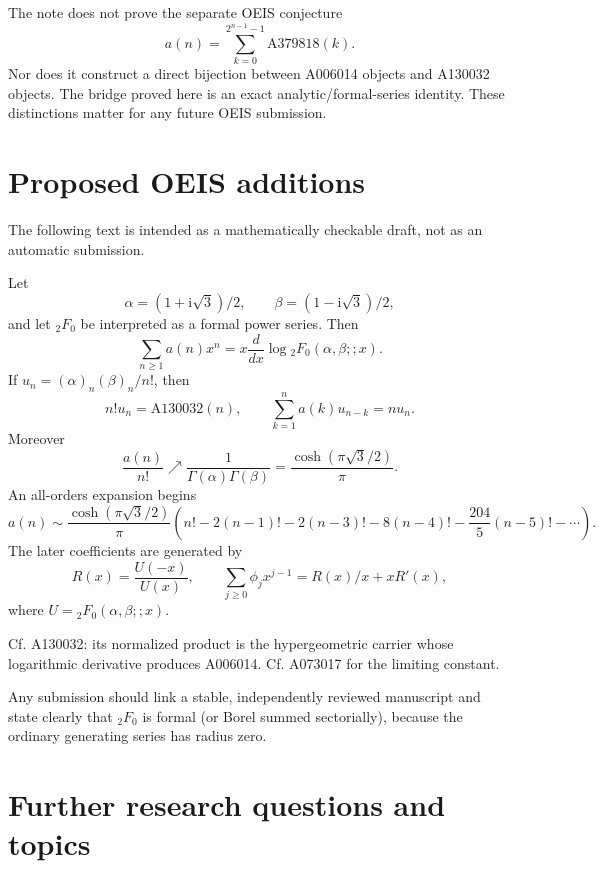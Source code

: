 \documentclass[11pt,a4paper]{article}
\theoremstyle{definition}
\theoremstyle{remark}
\newcommand{\ii}{\mathrm{i}}
\begin{document}
\begin{warningbox}
The note does not prove the separate OEIS conjecture
\[
 a(n)=\sum_{k=0}^{2^{n-1}-1}\mathrm{A379818}(k).
\]
Nor does it construct a direct bijection between A006014 objects and A130032 objects.  The bridge proved here is an exact analytic/formal-series identity.  These distinctions matter for any future OEIS submission.
\end{warningbox}

\section{Proposed OEIS additions}

The following text is intended as a mathematically checkable draft, not as an automatic submission.

\begin{resultbox}
Let
\[
 \alpha=(1+\ii\sqrt3)/2,\qquad \beta=(1-\ii\sqrt3)/2,
\]
and let \({}_2F_0\) be interpreted as a formal power series.  Then
\[
 \sum_{n\ge1}a(n)x^n
 =x\frac{d}{dx}\log{}_2F_0(\alpha,\beta;;x).
\]
If \(u_n=(\alpha)_n(\beta)_n/n!\), then
\[
 n!u_n=\mathrm{A130032}(n),\qquad
 \sum_{k=1}^{n}a(k)u_{n-k}=nu_n.
\]
Moreover
\[
 \frac{a(n)}{n!}\nearrow
 \frac{1}{\Gamma(\alpha)\Gamma(\beta)}
 =\frac{\cosh(\pi\sqrt3/2)}{\pi}.
\]
An all-orders expansion begins
\[
 a(n)\sim\frac{\cosh(\pi\sqrt3/2)}{\pi}
 \left(n!-2(n-1)!-2(n-3)!-8(n-4)!-\frac{204}{5}(n-5)!-\cdots\right).
\]
The later coefficients are generated by
\[
 R(x)=\frac{U(-x)}{U(x)},\qquad
 \sum_{j\ge0}\phi_jx^{j-1}=R(x)/x+xR'(x),
\]
where \(U={}_2F_0(\alpha,\beta;;x)\).
\end{resultbox}

\begin{resultbox}
Cf. A130032: its normalized product is the hypergeometric carrier whose logarithmic derivative produces A006014.  Cf. A073017 for the limiting constant.
\end{resultbox}

Any submission should link a stable, independently reviewed manuscript and state clearly that \({}_2F_0\) is formal (or Borel summed sectorially), because the ordinary generating series has radius zero.

\section{Further research questions and topics}\label{sec:questions}
\end{document}
